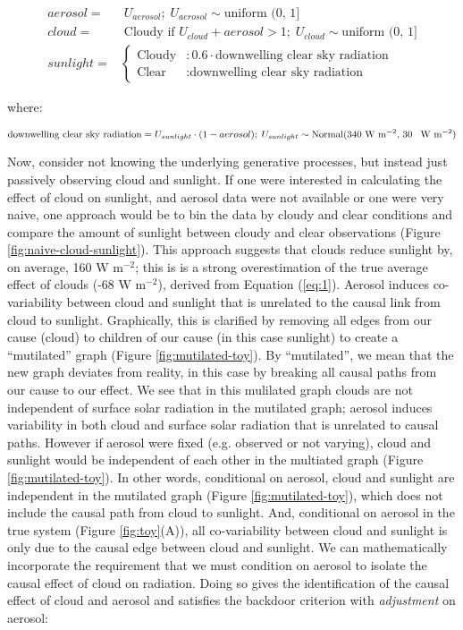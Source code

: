 \documentclass[12pt]{article}
\begin{document}
\begin{align}
  aerosol =& \; U_{aerosol}; \; U_{aerosol} \sim \text{uniform (0, 1]}\\
  cloud =& \; \text{Cloudy if } U_{cloud} + aerosol > 1; \;
           U_{cloud} \sim \text{uniform (0, 1]}\\
  sunlight =& \begin{cases}
    \text{Cloudy} &: 0.6 \cdot \text{downwelling clear sky radiation}  \\
    \text{Clear} &: \text{downwelling clear sky radiation}
  \end{cases}
                   \label{eq:1}
\end{align}

where:

\begin{equation*}
  \text{downwelling clear sky radiation} = U_{sunlight} \cdot (1 - aerosol); \;
  U_{sunlight} \sim \text{Normal(340 W m$^{-2}$, 30 \, W m$^{-2}$)}
\end{equation*}

Now, consider not knowing the underlying generative processes, but
instead just passively observing cloud and sunlight. If one were
interested in calculating the effect of cloud on sunlight, and aerosol
data were not available or one were very naive, one approach would be
to bin the data by cloudy and clear conditions and compare the amount
of sunlight between cloudy and clear observations (Figure
\ref{fig:naive-cloud-sunlight}). This approach suggests that clouds
reduce sunlight by, on average, 160 W m$^{-2}$; this is is a strong
overestimation of the true average effect of clouds (-68 W m$^{-2}$),
derived from Equation (\ref{eq:1}). Aerosol induces co-variability
between cloud and sunlight that is unrelated to the causal link from
cloud to sunlight. Graphically, this is clarified by removing all
edges from our cause (cloud) to children of our cause (in this case
sunlight) to create a ``mutilated'' graph (Figure
\ref{fig:mutilated-toy}). By ``mutilated'', we mean that the new graph
deviates from reality, in this case by breaking all causal paths from
our cause to our effect. We see that in this mulilated graph clouds
are not independent of surface solar radiation in the mutilated graph;
aerosol induces variability in both cloud and surface solar radiation
that is unrelated to causal paths.  However if aerosol were fixed
(e.g. observed or not varying), cloud and sunlight would be
independent of each other in the multiated graph (Figure
\ref{fig:mutilated-toy}). In other words, conditional on aerosol,
cloud and sunlight are independent in the mutilated graph (Figure
\ref{fig:mutilated-toy}), which does not include the causal path from
cloud to sunlight. And, conditional on aerosol in the true system
(Figure \ref{fig:toy}(A)), all co-variability between cloud and
sunlight is only due to the causal edge between cloud and sunlight.
We can mathematically incorporate the requirement that we must
condition on aerosol to isolate the causal effect of cloud on
radiation. Doing so gives the identification of the causal effect of
cloud and aerosol and satisfies the backdoor criterion with
\textit{adjustment} on aerosol:
\end{document}

